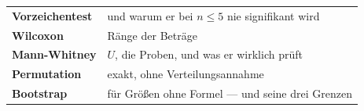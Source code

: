 \begin{merksatz}
\begin{center}
\renewcommand{\arraystretch}{1.5}
\begin{tabular}{@{}P{3.0cm}P{5.6cm}@{}}
\toprule
\textbf{Vorzeichentest} & und warum er bei $n \le 5$ nie signifikant wird\\
\textbf{Wilcoxon} & Ränge der Beträge\\
\textbf{Mann-Whitney} & $U$, die Proben, und was er wirklich prüft\\
\textbf{Permutation} & exakt, ohne Verteilungsannahme\\
\textbf{Bootstrap} & für Größen ohne Formel --- und seine drei Grenzen\\
\bottomrule
\end{tabular}
\end{center}

\begin{center}
\begin{minipage}{0.88\textwidth}
\end{minipage}
\end{center}
\end{merksatz}
